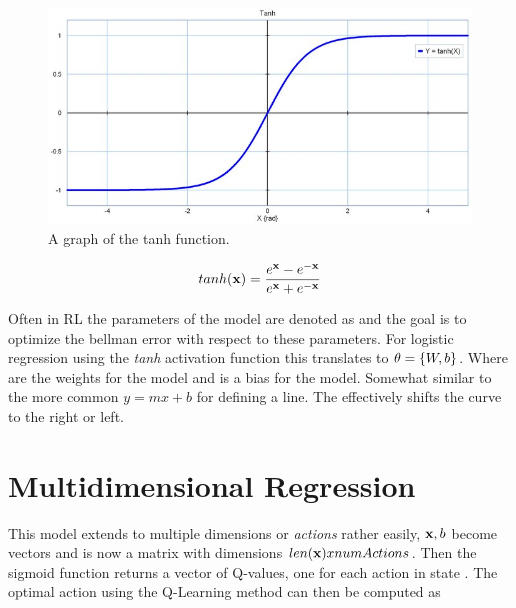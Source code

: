\begin{figure}
	\label{figure:tanh-function}
	\includegraphics[width=0.95\linewidth]{../images/tanh_zoom60.jpg}
	\caption{A graph of the tanh function.}
\end{figure}

\begin{equation}
	tanh(\textbf{x})=\frac
	{e^{\textbf{x}}-e^{-\textbf{x}}}
	{e^{\textbf{x}}+e^{-\textbf{x}}}
\end{equation}


Often in RL the parameters of the model are denoted as \modelParameters and the goal is to optimize the bellman error with respect to these parameters. For logistic regression using the \textit{tanh} activation function this translates to $\theta=\{W,b\}$. Where \weightMatrix are the weights for the model and \basisVector is a bias for the model. Somewhat similar to the more common $y=mx+b$ for defining a line. The \basisVector effectively shifts the curve to the right or left.

\section{Multidimensional Regression}

This model extends to multiple dimensions or \textit{actions} rather easily, $\textbf{x}, b$ become vectors and \weightMatrix is now a matrix with dimensions $len(\textbf{x}) x numActions$. Then the sigmoid function returns a vector of Q-values, one for each action in state . The optimal action using the Q-Learning method can then be computed as

